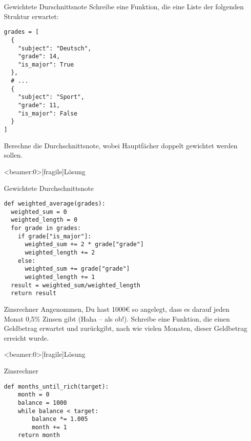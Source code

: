 \begin{fragile}

\begin{block}{Gewichtete Durschnittsnote}
	\vspace{2pt}
Schreibe eine Funktion, die eine Liste der folgenden Struktur erwartet: 

\begin{verbatim}
grades = [ 
  { 
    "subject": "Deutsch", 
    "grade": 14,
    "is_major": True
  },
  # ... 
  {
    "subject": "Sport",
    "grade": 11, 
    "is_major": False
  }
]
\end{verbatim}

Berechne die Durchschnittsnote, wobei Hauptfächer doppelt gewichtet werden sollen. 
\end{block}

\end{fragile}

\begin{frame}<beamer:0>[fragile]{Lösung}

\begin{solutionblock}{Gewichtete Durchschnittsnote}
\begin{verbatim}
def weighted_average(grades): 
  weighted_sum = 0
  weighted_length = 0
  for grade in grades: 
    if grade["is_major"]: 
      weighted_sum += 2 * grade["grade"]
      weighted_length += 2
    else:
      weighted_sum += grade["grade"]
      weighted_length += 1
  result = weighted_sum/weighted_length
  return result 
\end{verbatim}
\end{solutionblock}

\end{frame}


\begin{fragile}[Übung]
\begin{block}{Zinsrechner}
\vspace{2pt}
Angenommen, Du hast 1000€ so angelegt, dass es darauf jeden Monat 0,5\% Zinsen gibt (Haha -- als ob!). 
Schreibe eine Funktion, die einen Geldbetrag erwartet und zurückgibt, nach wie vielen Monaten, dieser Geldbetrag erreicht wurde. 
\end{block}
\end{fragile}

\begin{frame}<beamer:0>[fragile]{Lösung}

\begin{solutionblock}{Zinsrechner}
\begin{verbatim}
def months_until_rich(target):
    month = 0
    balance = 1000
    while balance < target:
        balance *= 1.005
        month += 1
    return month
\end{verbatim}
\end{solutionblock}
\end{frame}



